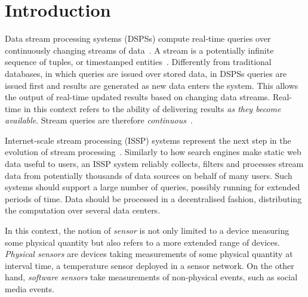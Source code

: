 \chapter{Introduction}
\label{ch:introduction}

Data stream processing systems (DSPSs) compute real-time queries over continuously changing streams of
data~\cite{8-reqs}. A stream is a potentially infinite sequence of tuples, or timestamped
entities~\cite{cql}. Differently from traditional databases, in which queries are issued over stored
data, in DSPSs queries are issued first and results are generated as new data enters the system.
This allows the output of real-time updated results based on changing data
streams. Real-time in this context refers to the ability of delivering results \emph{as they become
available}. Stream queries are therefore \emph{continuous}~\cite{cont-queries}.

Internet-scale stream processing (ISSP) systems represent the next step in the evolution of stream
processing~\cite{dissp-challanges}.
Similarly to how search engines make static web data useful to users, an ISSP system reliably
collects, filters and processes stream data from potentially thousands of data sources on behalf of many
users. Such systems should support a large number of queries, possibly running for extended periods of
time. Data should be processed in a decentralised fashion, distributing the computation over several data
centers.

In this context, the notion of \emph{sensor} is not only limited to a device measuring some physical
quantity but also refers to a more extended range of devices. \emph{Physical sensors} are devices taking
measurements of some physical quantity at interval time, \eg a temperature sensor deployed in a
sensor network. On the other hand, \emph{software sensors} take measurements of non-physical events,
such as social media events.

